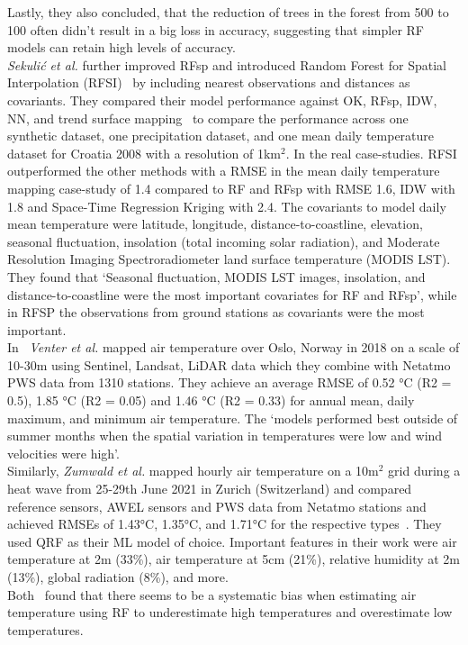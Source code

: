 Lastly, they also concluded, that the reduction of trees in the forest from 500 to 100 often didn't result in a big loss in accuracy, suggesting that simpler RF models can retain high levels of accuracy.\\
\textit{Sekuli{\'c} et al.} further improved RFsp and introduced Random Forest for Spatial Interpolation (RFSI)~\cite{sekulic2020random} by including nearest observations and distances as covariants. They compared their model performance against OK, RFsp, IDW, NN, and trend surface mapping~\cite{chorley1965trend} to compare the performance across one synthetic dataset, one precipitation dataset, and one mean daily temperature dataset for Croatia 2008 with a resolution of 1km$^2$. In the real case-studies. RFSI outperformed the other methods with a RMSE in the mean daily temperature mapping case-study of 1.4 compared to RF and RFsp with RMSE 1.6, IDW with 1.8 and Space-Time Regression Kriging with 2.4. The covariants to model daily mean temperature were latitude, longitude, distance-to-coastline, elevation, seasonal fluctuation, insolation (total incoming solar radiation), and Moderate Resolution Imaging Spectroradiometer land surface temperature (MODIS LST). They found that `Seasonal fluctuation, MODIS LST images, insolation, and distance-to-coastline were the most important covariates for RF and RFsp', while in RFSP the observations from ground stations as covariants were the most important.\\
In~\cite{venter2020hyperlocal} \textit{Venter et al.} mapped air temperature over Oslo, Norway in 2018 on a scale of 10-30m using Sentinel, Landsat, LiDAR data which they combine with Netatmo PWS data from 1310 stations. They achieve an average RMSE of 0.52 °C (R2 = 0.5), 1.85 °C (R2 = 0.05) and 1.46 °C (R2 = 0.33) for annual mean, daily maximum, and minimum air temperature. The `models performed best outside of summer months when the spatial variation in temperatures were low and wind velocities were high'.\\
Similarly, \textit{Zumwald et al.} mapped hourly air temperature on a 10m$^2$ grid during a heat wave from 25-29th June 2021 in Zurich (Switzerland) and compared reference sensors, AWEL sensors and PWS data from Netatmo stations and achieved RMSEs of 1.43°C, 1.35°C, and 1.71°C for the respective types~\cite{zumwald2021mapping}. They used QRF as their ML model of choice. Important features in their work were air temperature at 2m (33\%), air temperature at 5cm (21\%), relative humidity at 2m (13\%), global radiation (8\%), and more.\\
Both~\cite{zumwald2021mapping, zhang2012bias} found that there seems to be a systematic bias when estimating air temperature using RF to underestimate high temperatures and overestimate low temperatures.

